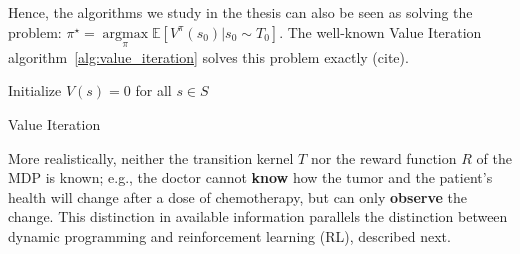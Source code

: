 Hence, the algorithms we study in the thesis can also be seen as solving the problem: $\pi^{\star} = \underset{\pi}{\operatorname{argmax}}\mathbb{E}\left[V^{\pi}(s_0)|s_0\sim T_0 \right]$. The well-known Value Iteration algorithm~\ref{alg:value_iteration} solves this problem exactly (cite). 

\begin{algorithm}
    Initialize $V(s) = 0$ for all $s \in S$ \\
    \caption{Value Iteration}\label{alg:value_iteration}
\end{algorithm}

More realistically, neither the transition kernel $T$ nor the reward function $R$ of the MDP is known; e.g., the doctor cannot \textbf{know} how the tumor and the patient's health will change after a dose of chemotherapy, but can only \textbf{observe} the change. This distinction in available information parallels the distinction between dynamic programming and reinforcement learning (RL), described next. 

